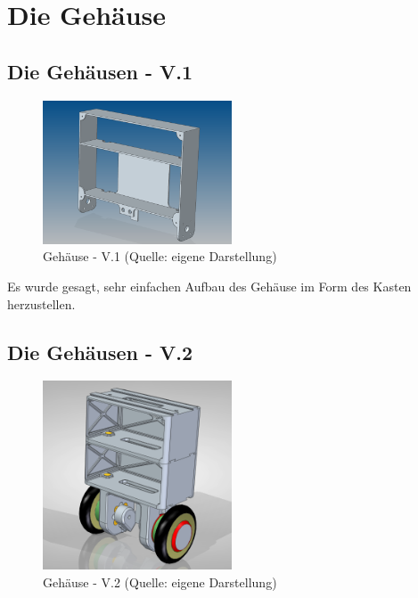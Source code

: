 \renewcommand{\autoren}{Valentyn Chepil, Alexsander Stoiljkovic}
\newpage
\section{Die Gehäuse}
\subsection{Die Gehäusen - V.1}

\begin{figure}[!h]  %
	\centering\includegraphics[width=0.5\textwidth]{images/gehaeuse-v1.png}
	\caption{Gehäuse - V.1 \newline (Quelle: eigene Darstellung)}
	\label{gehaeuse-v1} %
\end{figure}

Es wurde gesagt, sehr einfachen Aufbau des Gehäuse im Form des Kasten herzustellen.


\subsection{Die Gehäusen - V.2}


\begin{figure}[!h]  %
	\centering\includegraphics[width=0.5\textwidth]{images/gehaeuse-v2.png}
	\caption{Gehäuse - V.2 \newline (Quelle: eigene Darstellung)}
	\label{gehaeuse-v2} %
\end{figure}


